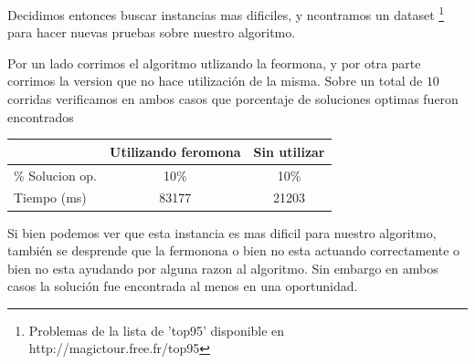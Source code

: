 Decidimos entonces buscar instancias mas dificiles, y ncontramos un dataset \footnote{Problemas de la lista de 'top95' disponible en http://magictour.free.fr/top95} 
para hacer nuevas pruebas sobre nuestro algoritmo.

Por un lado corrimos el algoritmo utlizando la feormona, y por otra parte corrimos la version que no hace utilización  de 
la misma. Sobre un total de $10$ corridas verificamos en ambos casos que 
porcentaje de soluciones optimas fueron encontrados

\begin{center}
  \begin{tabular}{ | l | c | c |}
    \hline
     & Utilizando feromona & Sin utilizar \\  \hline
     \% Solucion op. & 10\% & 10\% \\ \hline
    Tiempo (ms) & 83177 & 21203 \\
    \hline
  \end{tabular}
\end{center}

Si bien podemos ver que esta instancia es mas dificil para nuestro algoritmo, 
también se desprende que la fermonona o bien no esta actuando correctamente o 
bien no esta ayudando por alguna razon al algoritmo. Sin embargo en ambos casos 
la solución fue encontrada al menos en una oportunidad. 


\newpage























